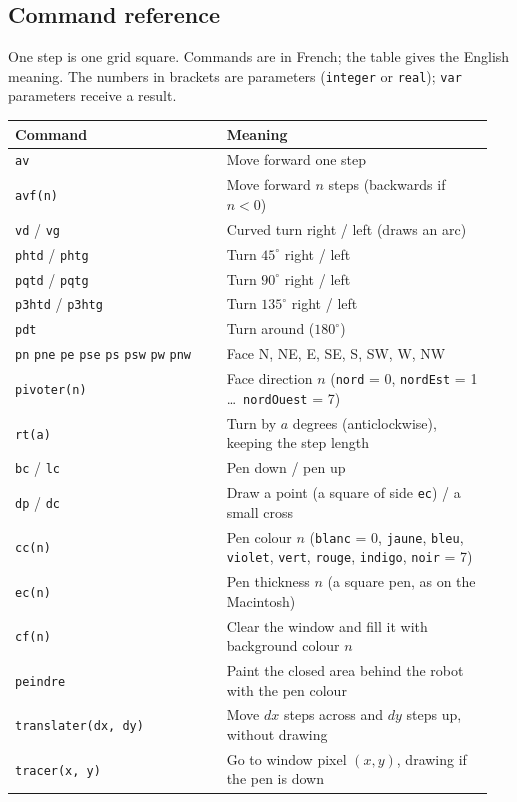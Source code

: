 \documentclass[11pt,a4paper]{article}
\newcommand{\kbd}[1]{\texttt{#1}}
\begin{document}
\subsection{Command reference}
One step is one grid square. Commands are in French; the table gives the
English meaning. The numbers in brackets are parameters (\kbd{integer} or
\kbd{real}); \kbd{var} parameters receive a result.

\begin{longtable}{@{}p{0.42\linewidth} p{0.53\linewidth}@{}}
\toprule
\textbf{Command} & \textbf{Meaning} \\
\midrule
\endhead
\bottomrule
\endfoot
\kbd{av} & Move forward one step \\
\kbd{avf(n)} & Move forward $n$ steps (backwards if $n < 0$) \\
\kbd{vd} / \kbd{vg} & Curved turn right / left (draws an arc) \\
\kbd{phtd} / \kbd{phtg} & Turn $45^\circ$ right / left \\
\kbd{pqtd} / \kbd{pqtg} & Turn $90^\circ$ right / left \\
\kbd{p3htd} / \kbd{p3htg} & Turn $135^\circ$ right / left \\
\kbd{pdt} & Turn around ($180^\circ$) \\
\kbd{pn} \kbd{pne} \kbd{pe} \kbd{pse} \kbd{ps} \kbd{psw} \kbd{pw} \kbd{pnw} & Face N, NE, E, SE, S, SW, W, NW \\
\kbd{pivoter(n)} & Face direction $n$ (\kbd{nord} = 0, \kbd{nordEst} = 1 \dots\ \kbd{nordOuest} = 7) \\
\kbd{rt(a)} & Turn by $a$ degrees (anticlockwise), keeping the step length \\
\kbd{bc} / \kbd{lc} & Pen down / pen up \\
\kbd{dp} / \kbd{dc} & Draw a point (a square of side \kbd{ec}) / a small cross \\
\kbd{cc(n)} & Pen colour $n$ (\kbd{blanc} = 0, \kbd{jaune}, \kbd{bleu}, \kbd{violet}, \kbd{vert}, \kbd{rouge}, \kbd{indigo}, \kbd{noir} = 7) \\
\kbd{ec(n)} & Pen thickness $n$ (a square pen, as on the Macintosh) \\
\kbd{cf(n)} & Clear the window and fill it with background colour $n$ \\
\kbd{peindre} & Paint the closed area behind the robot with the pen colour \\
\kbd{translater(dx, dy)} & Move $dx$ steps across and $dy$ steps up, without drawing \\
\kbd{tracer(x, y)} & Go to window pixel $(x, y)$, drawing if the pen is down \\

\end{longtable}
\end{document}
